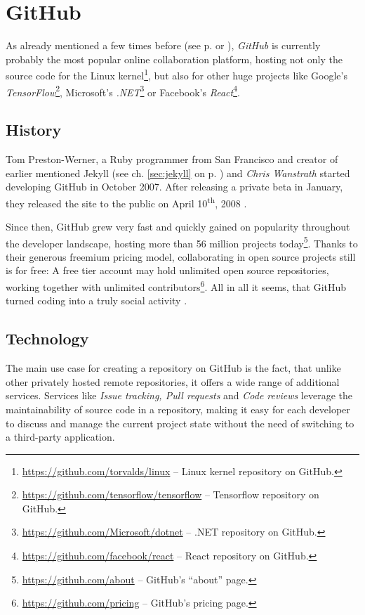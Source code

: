 \section{GitHub}
\label{sec:git-github}

As already mentioned a few times before (see p. \pageref{sec:jekyll} or \pageref{sec:buildpipelines-markdown}), \emph{GitHub} is currently probably the most popular online collaboration platform, hosting not only the source code for the Linux kernel\footnote{\url{https://github.com/torvalds/linux} -- Linux kernel repository on GitHub.}, but also for other huge projects like Google's \emph{TensorFlow}\footnote{\url{https://github.com/tensorflow/tensorflow} -- Tensorflow repository on GitHub.}, Microsoft's \emph{.NET}\footnote{\url{https://github.com/Microsoft/dotnet} -- .NET repository on GitHub.} or Facebook's \emph{React}\footnote{\url{https://github.com/facebook/react} -- React repository on GitHub.}.

\subsection{History}
\label{sec:github-history}
Tom Preston-Werner, a Ruby programmer from San Francisco and creator of earlier mentioned Jekyll (see ch. \ref{sec:jekyll} on p. \pageref{sec:jekyll}) and \emph{Chris Wanstrath} started developing GitHub in October 2007. After releasing a private beta in January, they released the site to the public on April 10\textsuperscript{th}, 2008 \cite{PrestonWerner2008githublaunch}.

Since then, GitHub grew very fast and quickly gained on popularity throughout the developer landscape, hosting more than 56 million projects today\footnote{\url{https://github.com/about} -- GitHub's ``about'' page.}. Thanks to their generous freemium pricing model, collaborating in open source projects still is for free: A free tier account may hold unlimited open source repositories, working together with unlimited contributors\footnote{\url{https://github.com/pricing} -- GitHub's pricing page.}. All in all it seems, that GitHub turned coding into a truly social activity \cite[416]{loeliger2012version}.

\subsection{Technology}
The main use case for creating a repository on GitHub is the fact, that unlike other privately hosted remote repositories, it offers a wide range of additional services. Services like \emph{Issue tracking, Pull requests} and \emph{Code reviews} leverage the maintainability of source code in a repository, making it easy for each developer to discuss and manage the current project state without the need of switching to a third-party application.

